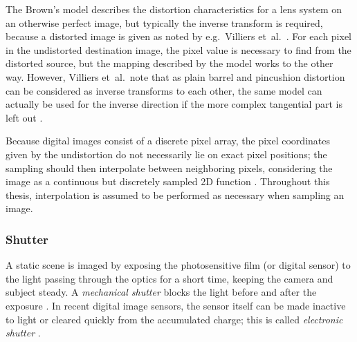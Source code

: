 The Brown's model describes the distortion characteristics for a lens system on an otherwise perfect image, but typically the inverse transform is required, because a distorted image is given as noted by e.g.\ Villiers et~al.~\cite{villiers2008centi}.
For each pixel in the undistorted destination image, the pixel value is necessary to find from the distorted source, but the mapping described by the model works to the other way.
However, Villiers et~al.\ note that as plain barrel and pincushion distortion can be considered as inverse transforms to each other, the same model can actually be used for the inverse direction if the more complex tangential part is left out \cite{villiers2008centi}.

Because digital images consist of a discrete pixel array, the pixel coordinates given by the undistortion do not necessarily lie on exact pixel positions; the sampling should then interpolate between neighboring pixels, considering the image as a continuous but discretely sampled 2D function \cite{wolberg1990digital}.
Throughout this thesis, interpolation is assumed to be performed as necessary when sampling an image.



\subsubsection{Shutter} %


A static scene is imaged by exposing the photosensitive film (or digital sensor) to the light passing through the optics for a short time, keeping the camera and subject steady.
A \emph{mechanical shutter} blocks the light before and after the exposure \cite[ch.~13]{greenleaf1950photographic}.
In recent digital image sensors, the sensor itself can be made inactive to light or cleared quickly from the accumulated charge; this is called \emph{electronic shutter} \cite{caspeelectronic,kodakshutter}.



